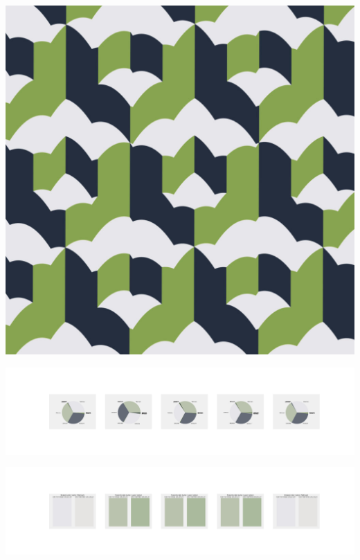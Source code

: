 \documentclass[11pt]{article}
\begin{document}
\begin{landscape}
    \begin{center}
    \includegraphics[width=\textwidth]{./nbimg/file (316).jpg}
    \end{center}

    \begin{center}
    \includegraphics[width=250mm]{./nbimg/pie-241.jpg}
    \end{center}

    \begin{center}
    \includegraphics[width=250mm]{./nbimg/peak-241.jpg}
    \end{center}
    


\end{landscape}
\end{document}
